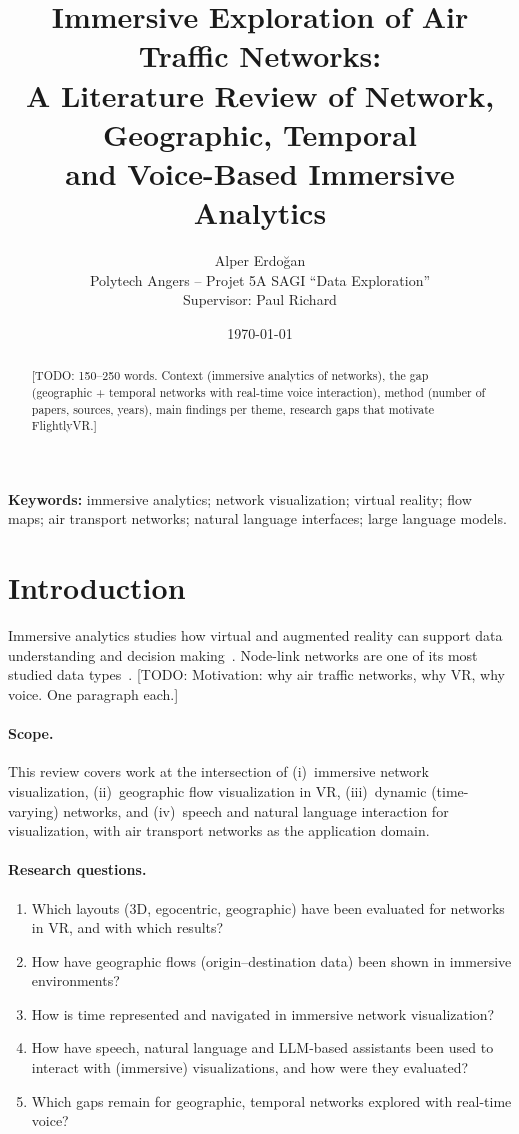 \documentclass[11pt,a4paper]{article}
\title{Immersive Exploration of Air Traffic Networks:\\
  A Literature Review of Network, Geographic, Temporal\\
  and Voice-Based Immersive Analytics}
\author{Alper Erdo\u{g}an\\
  Polytech Angers -- Projet 5A SAGI ``Data Exploration''\\
  \small Supervisor: Paul Richard}
\date{\today}
\newif\ifshowtodos \showtodostrue
\newcommand{\todo}[2][]{\ifshowtodos{\color{red}\footnotesize[TODO: #2]}\fi}
\newcommand{\system}{FlightlyVR}
\begin{document}
\maketitle

\begin{abstract}
\todo[inline]{150--250 words. Context (immersive analytics of networks), the gap
(geographic + temporal networks with real-time voice interaction), method (number of
papers, sources, years), main findings per theme, research gaps that motivate \system.}
\end{abstract}

\noindent\textbf{Keywords:} immersive analytics; network visualization; virtual reality;
flow maps; air transport networks; natural language interfaces; large language models.

\section{Introduction}
\label{sec:intro}

Immersive analytics studies how virtual and augmented reality can support data
understanding and decision making~\cite{marriott2018immersive,ens2021grand}.
Node-link networks are one of its most studied data types~\cite{joos2025survey}.
\todo{Motivation: why air traffic networks, why VR, why voice. One paragraph each.}

\paragraph{Scope.} This review covers work at the intersection of
(i)~immersive network visualization,
(ii)~geographic flow visualization in VR,
(iii)~dynamic (time-varying) networks, and
(iv)~speech and natural language interaction for visualization,
with air transport networks as the application domain.

\paragraph{Research questions.}
\begin{enumerate}[label=\textbf{RQ\arabic*}, leftmargin=*]
  \item Which layouts (3D, egocentric, geographic) have been evaluated for networks in VR,
        and with which results?
  \item How have geographic flows (origin--destination data) been shown in immersive
        environments?
  \item How is time represented and navigated in immersive network visualization?
  \item How have speech, natural language and LLM-based assistants been used to interact
        with (immersive) visualizations, and how were they evaluated?
  \item Which gaps remain for geographic, temporal networks explored with real-time voice?
\end{enumerate}
\end{document}
